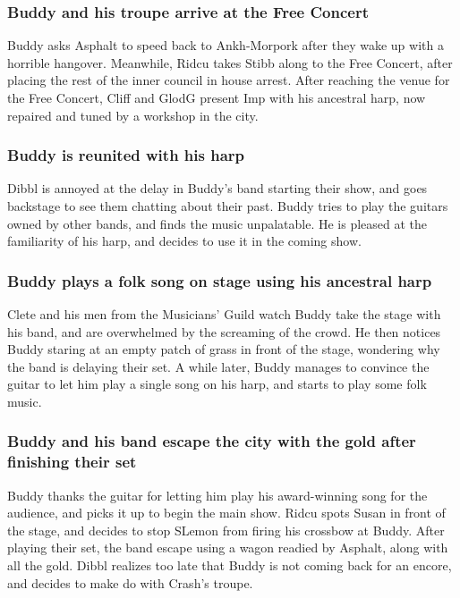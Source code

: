 \subsubsection{\Gls{Buddy} and his troupe arrive at the Free Concert}
\Gls{Buddy} asks \Gls{Asphalt} to speed back to Ankh-Morpork after they wake up with a horrible
hangover. Meanwhile, \Gls{Ridcu} takes \Gls{Stibb} along to the Free Concert, after placing the
rest of the inner council in house arrest. After reaching the venue for the Free Concert,
\Gls{Cliff} and \Gls{GlodG} present \Gls{Imp} with his ancestral harp, now repaired and tuned by
a workshop in the city.

\subsubsection{\Gls{Buddy} is reunited with his harp}
\Gls{Dibbl} is annoyed at the delay in \Gls{Buddy}'s band starting their show, and goes backstage
to see them chatting about their past. \Gls{Buddy} tries to play the guitars owned by other bands,
and finds the music unpalatable. He is pleased at the familiarity of his harp, and decides to use it
in the coming show.

\subsubsection{\Gls{Buddy} plays a folk song on stage using his ancestral harp}
\Gls{Clete} and his men from the Musicians' Guild watch \Gls{Buddy} take the stage with his band,
and are overwhelmed by the screaming of the crowd. He then notices \Gls{Buddy} staring at an empty
patch of grass in front of the stage, wondering why the band is delaying their set. A while later,
\Gls{Buddy} manages to convince the guitar to let him play a single song on his harp, and starts
to play some folk music.

\subsubsection{\Gls{Buddy} and his band escape the city with the gold after finishing their set}
\Gls{Buddy} thanks the guitar for letting him play his award-winning song for the audience, and
picks it up to begin the main show. \Gls{Ridcu} spots \Gls{Susan} in front of the stage, and decides
to stop \Gls{SLemon} from firing his crossbow at \Gls{Buddy}. After playing their set, the band
escape using a wagon readied by \Gls{Asphalt}, along with all the gold. \Gls{Dibbl} realizes too
late that \Gls{Buddy} is not coming back for an encore, and decides to make do with \Gls{Crash}'s
troupe.


